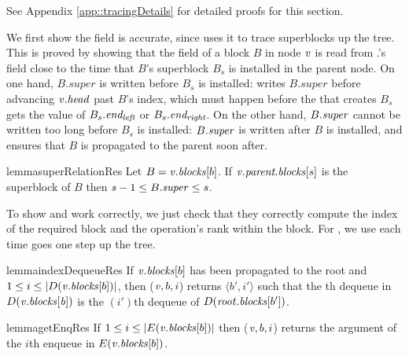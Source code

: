 See Appendix \ref{app::tracingDetails} for detailed proofs for this section.

We first show the  field is accurate, since  uses it to trace superblocks up the tree.  This is proved by showing that the  field of a block $B$ in node $\mbox{\textnormal{\textit{v}}}$ is read from  
.'s  field close to the time that $B$'s superblock $B_s$ is installed in the parent node.
On one hand, $B.super$ is written before $B_s$ is installed:
 writes $B.super$ before advancing $\mbox{\textnormal{\textit{v}}}.\mbox{\textit{head}}$  past $B$'s index, which must happen before the  that creates
$B_s$ gets the value of $B_s.\mbox{\textit{end\textsubscript{left}}}$ or $B_s.\mbox{\textit{end\textsubscript{right}}}$.
On the other hand, $B.\mbox{\textit{super}}$ cannot be written too long before $B_s$ is installed:
$B.\mbox{\textit{super}}$ is written after $B$ is installed, and  ensures that $B$ is propagated to the
parent soon after.

\begin{restatable}{lemma}{superRelationRes}
\label{superRelation}
Let $B=\mbox{\textnormal{\textit{v}}}.\mbox{\textnormal{\textit{blocks}}}[b]$.
  If $\mbox{\textnormal{\textit{v}}}.\mbox{\textit{parent.blocks}}[s]$ is the superblock of $B$ then $s-1\leq B.\mbox{\textit{super}}\leq s$.
\end{restatable}


To show   and  work correctly, we  just  check that they correctly compute the index of the required block
and the operation's rank within the block.  
For , we use  each time  goes one step up the tree.

\begin{restatable}{lemma}{indexDequeueRes}
\label{lem::indexDequeue}
If $\mbox{\textnormal{\textit{v}}}.\mbox{\textit{blocks}}[b]$ has been propagated to the root and $1\leq i\leq |D(\mbox{\textnormal{\textit{v}}}.\mbox{\textit{blocks}}[b])|$, 
 then ($\mbox{\textnormal{\textit{v}}}, b, i$) returns $\langle b',i' \rangle$ such that the th dequeue in $D(\mbox{\textnormal{\textit{v}}}.\mbox{\textit{blocks}}[\mbox{\textnormal{\textit{b}}}])$ is the $(i')$th dequeue of $D(\mbox{\textnormal{\textit{root}}}.\mbox{\textit{blocks}}[b'])$.
\end{restatable}

\begin{restatable}{lemma}{getEnqRes}
\label{lem::get}
If $1\leq i\leq |E(\mbox{\textnormal{\textit{v}}}.\mbox{\textit{blocks}}[b])|$ then ($\mbox{\textnormal{\textit{v}}},b,i$) returns the argument of the $i$th enqueue in $E(\mbox{\textnormal{\textit{v}}}.\mbox{\textit{blocks}}[b])$.
\end{restatable}

